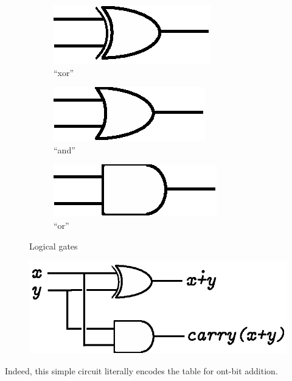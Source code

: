 \begin{figure}[t]
  \begin{subfigure}[t]{0.3\textwidth}
    \centering
    \includegraphics[scale=0.6]{images/06-01.eps}
    \caption{``xor''}
    \label{gates-xor}
  \end{subfigure}
  \begin{subfigure}[t]{0.3\textwidth}
    \centering
    \includegraphics[scale=0.6]{images/06-02.eps}
    \caption{``and''}
    \label{gates-and}
  \end{subfigure}
  \begin{subfigure}[t]{0.3\textwidth}
    \centering
    \includegraphics[scale=0.6]{images/06-03.eps}
    \caption{``or''}
    \label{gates-or}
  \end{subfigure}
  \caption{Logical gates}
  \label{gates}
\end{figure}


\begin{figure}[h]
  \centering
  \includegraphics[scale=0.6]{images/06-04.eps}  
\end{figure}

Indeed, this simple circuit literally encodes the table for ont-bit addition.

